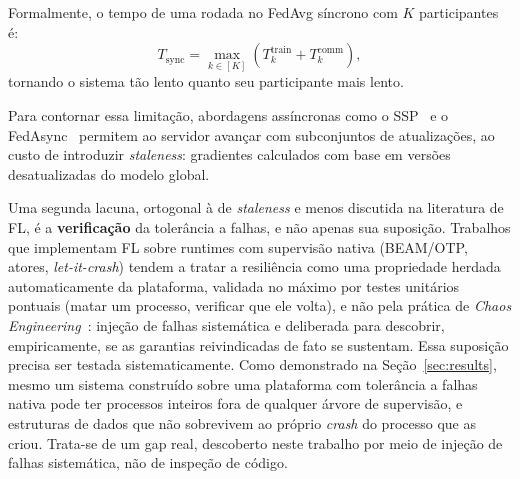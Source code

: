\documentclass[conference,a4paper]{IEEEtran}
\begin{document}
Formalmente, o tempo de uma rodada no FedAvg síncrono com $K$ participantes é:
\begin{equation}
T_{\text{sync}} = \max_{k \in [K]}\left(T_k^{\text{train}} +
T_k^{\text{comm}}\right),
\label{eq:sync_round}
\end{equation}
tornando o sistema tão lento quanto seu participante mais lento.

Para contornar essa limitação, abordagens assíncronas como o SSP~\cite{ho2013}
e o FedAsync~\cite{xie2019} permitem ao servidor avançar com subconjuntos
de atualizações, ao custo de introduzir \textit{staleness}: gradientes
calculados com base em versões desatualizadas do modelo global.

Uma segunda lacuna, ortogonal à de \textit{staleness} e menos discutida na
literatura de FL, é a \textbf{verificação} da tolerância a falhas, e não
apenas sua suposição. Trabalhos que implementam FL sobre runtimes com
supervisão nativa (BEAM/OTP, atores, \textit{let-it-crash}) tendem a
tratar a resiliência como uma propriedade herdada automaticamente da
plataforma, validada no máximo por testes unitários pontuais (matar um
processo, verificar que ele volta), e não pela prática de \textit{Chaos
Engineering}~\cite{basiri2016}: injeção de falhas sistemática e
deliberada para descobrir, empiricamente, se as garantias reivindicadas de
fato se sustentam. Essa
suposição precisa ser testada sistematicamente. Como demonstrado na
Seção~\ref{sec:results}, mesmo um sistema construído sobre uma plataforma
com tolerância a falhas nativa pode ter processos inteiros fora de
qualquer árvore de supervisão, e estruturas de dados que não sobrevivem ao
próprio \textit{crash} do processo que as criou. Trata-se de um gap real,
descoberto neste trabalho por meio de injeção de falhas sistemática, não
de inspeção de código.
\end{document}
